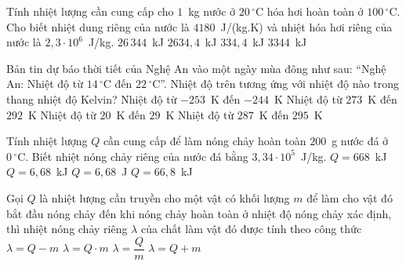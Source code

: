 	\begin{ex}%
		Tính nhiệt lượng cần cung cấp cho $1$~kg nước ở $20\,^\circ\text{C}$ hóa hơi hoàn toàn ở $100\,^\circ\text{C}$. Cho biết nhiệt dung riêng của nước là $4180$~J/(kg.K) và nhiệt hóa hơi riêng của nước là $2{,}3\cdot 10^6$~J/kg.
		\choice
		{$26\,344$~kJ}
		{\True $2634{,}4$~kJ}
		{$334{,}4$~kJ}
		{$3344$~kJ}
	\end{ex}

	\begin{ex}%
		Bản tin dự báo thời tiết của Nghệ An vào một ngày mùa đông như sau: ``Nghệ An: Nhiệt độ từ $14\,^\circ\text{C}$ đến $22\,^\circ\text{C}$''. Nhiệt độ trên tương ứng với nhiệt độ nào trong thang nhiệt độ Kelvin?
		\choice
		{Nhiệt độ từ $-253$~K đến $-244$~K}
		{Nhiệt độ từ $273$~K đến $292$~K}
		{Nhiệt độ từ $20$~K đến $29$~K}
		{\True Nhiệt độ từ $287$~K đến $295$~K}
	\end{ex}

	\begin{ex}%
		Tính nhiệt lượng $Q$ cần cung cấp để làm nóng chảy hoàn toàn $200$~g nước đá ở $0\,^\circ\text{C}$. Biết nhiệt nóng chảy riêng của nước đá bằng $3{,}34\cdot 10^5$~J/kg.
		\choice
		{$Q=668$~kJ}
		{$Q=6{,}68$~kJ}
		{$Q=6{,}68$~J}
		{\True $Q=66{,}8$~kJ}
	\end{ex}

	\begin{ex}%
		Gọi $Q$ là nhiệt lượng cần truyền cho một vật có khối lượng $m$ để làm cho vật đó bắt đầu nóng chảy đến khi nóng chảy hoàn toàn ở nhiệt độ nóng chảy xác định, thì nhiệt nóng chảy riêng $\lambda$ của chất làm vật đó được tính theo công thức
		\choice
		{$\lambda=Q-m$}
		{$\lambda=Q\cdot m$}
		{\True $\lambda=\dfrac{Q}{m}$}
		{$\lambda=Q+m$}
	\end{ex}


